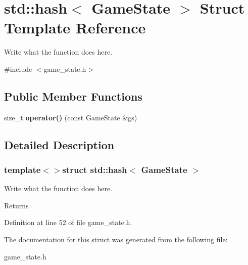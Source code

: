 \hypertarget{structstd_1_1hash_3_01GameState_01_4}{\section{std\+:\+:hash$<$ Game\+State $>$ Struct Template Reference}
\label{structstd_1_1hash_3_01GameState_01_4}
}


Write what the function does here.  




{\ttfamily \#include $<$game\+\_\+state.\+h$>$}

\subsection*{Public Member Functions}
\begin{DoxyCompactItemize}
\item 
\hypertarget{structstd_1_1hash_3_01GameState_01_4_a80bc04f6863a11c65730e753fe9ce8d4}{size\+\_\+t {\bfseries operator()} (const Game\+State \&gs)}\label{structstd_1_1hash_3_01GameState_01_4_a80bc04f6863a11c65730e753fe9ce8d4}

\end{DoxyCompactItemize}


\subsection{Detailed Description}
\subsubsection*{template$<$$>$struct std\+::hash$<$ Game\+State $>$}

Write what the function does here. 

\begin{DoxyReturn}{Returns}

\end{DoxyReturn}


Definition at line 52 of file game\+\_\+state.\+h.



The documentation for this struct was generated from the following file\+:\begin{DoxyCompactItemize}
\item 
game\+\_\+state.\+h\end{DoxyCompactItemize}
